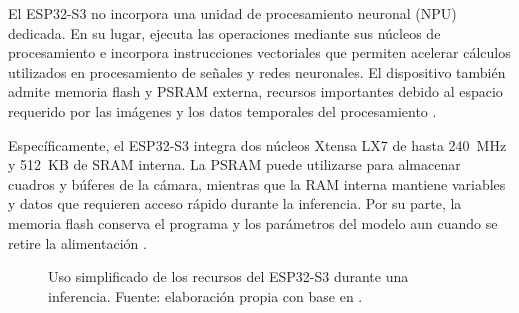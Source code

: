 El ESP32-S3 no incorpora una unidad de procesamiento neuronal (NPU) dedicada.
En su lugar, ejecuta las operaciones mediante sus núcleos de procesamiento e
incorpora instrucciones vectoriales que permiten acelerar cálculos utilizados
en procesamiento de señales y redes neuronales. El dispositivo también admite
memoria flash y PSRAM externa, recursos importantes debido al espacio requerido
por las imágenes y los datos temporales del procesamiento
\cite{ESP32S3Datasheet}.

Específicamente, el ESP32-S3 integra dos núcleos Xtensa LX7 de hasta 240~MHz y
512~KB de SRAM interna. La PSRAM puede utilizarse para almacenar cuadros y
búferes de la cámara, mientras que la RAM interna mantiene variables y datos
que requieren acceso rápido durante la inferencia. Por su parte, la memoria
flash conserva el programa y los parámetros del modelo aun cuando se retire la
alimentación \cite{ESP32S3Datasheet,ESPDLModelExecution,ESP32Camera}.

\begin{figure}[H]
    \centering
    \caption{Uso simplificado de los recursos del ESP32-S3 durante una
    inferencia. Fuente: elaboración propia con base en
    \cite{ESP32S3Datasheet,ESPDLModelExecution,ESP32Camera}.}
    \label{fig:recursos_vision_esp32s3}
\end{figure}

